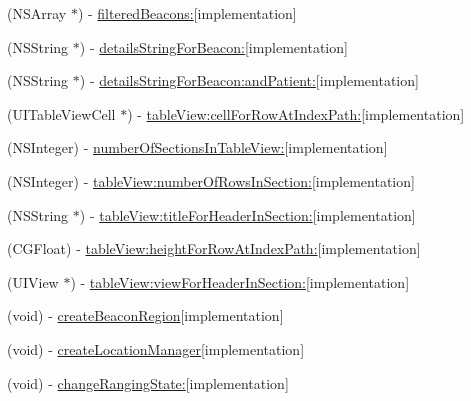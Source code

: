 \begin{DoxyCompactItemize}
\item 
(N\+S\+Array $\ast$) -\/ \hyperlink{interface_beacon_view_controller_a739279c1b304ae031197c4c5bce7a295}{filtered\+Beacons\+:}{\ttfamily  \mbox{[}implementation\mbox{]}}
\item 
(N\+S\+String $\ast$) -\/ \hyperlink{interface_beacon_view_controller_a4d4b1c6f59b7f0bb22d198e8573c23d6}{details\+String\+For\+Beacon\+:}{\ttfamily  \mbox{[}implementation\mbox{]}}
\item 
(N\+S\+String $\ast$) -\/ \hyperlink{interface_beacon_view_controller_a89b3653446126ec57ac8b26980dd7a69}{details\+String\+For\+Beacon\+:and\+Patient\+:}{\ttfamily  \mbox{[}implementation\mbox{]}}
\item 
(U\+I\+Table\+View\+Cell $\ast$) -\/ \hyperlink{interface_beacon_view_controller_ae82674f2019ef6bf20dd3ccc17261528}{table\+View\+:cell\+For\+Row\+At\+Index\+Path\+:}{\ttfamily  \mbox{[}implementation\mbox{]}}
\item 
(N\+S\+Integer) -\/ \hyperlink{interface_beacon_view_controller_a3beff10222d197f9ca94964b9cad4eb7}{number\+Of\+Sections\+In\+Table\+View\+:}{\ttfamily  \mbox{[}implementation\mbox{]}}
\item 
(N\+S\+Integer) -\/ \hyperlink{interface_beacon_view_controller_af0acf82d8a332a6f991ddfb823a5988c}{table\+View\+:number\+Of\+Rows\+In\+Section\+:}{\ttfamily  \mbox{[}implementation\mbox{]}}
\item 
(N\+S\+String $\ast$) -\/ \hyperlink{interface_beacon_view_controller_a1ab9d4eec4632d983ae90938b4b42ead}{table\+View\+:title\+For\+Header\+In\+Section\+:}{\ttfamily  \mbox{[}implementation\mbox{]}}
\item 
(C\+G\+Float) -\/ \hyperlink{interface_beacon_view_controller_aaad426a8d549b4d9cd8d2379c7b62ff4}{table\+View\+:height\+For\+Row\+At\+Index\+Path\+:}{\ttfamily  \mbox{[}implementation\mbox{]}}
\item 
(U\+I\+View $\ast$) -\/ \hyperlink{interface_beacon_view_controller_a83d9149cd374ac94ccfac9c32be15ebd}{table\+View\+:view\+For\+Header\+In\+Section\+:}{\ttfamily  \mbox{[}implementation\mbox{]}}
\item 
(void) -\/ \hyperlink{interface_beacon_view_controller_af99bb14d67dc3d2e7746942eb06be634}{create\+Beacon\+Region}{\ttfamily  \mbox{[}implementation\mbox{]}}
\item 
(void) -\/ \hyperlink{interface_beacon_view_controller_af6579a12081d79f8c4e5f0ef4637de4d}{create\+Location\+Manager}{\ttfamily  \mbox{[}implementation\mbox{]}}
\item 
(void) -\/ \hyperlink{interface_beacon_view_controller_a025632847eef0d10899344a49b20dc1c}{change\+Ranging\+State\+:}{\ttfamily  \mbox{[}implementation\mbox{]}}

\end{DoxyCompactItemize}
